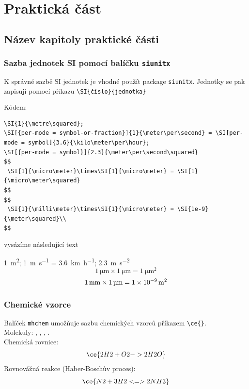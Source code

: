\documentclass[12pt]{report}
\begin{document}
\lipsum[6]

\part{Praktická část} %

\chapter{Název kapitoly praktické části}

\section{Sazba jednotek SI pomocí balíčku \texttt{siunitx}}

K správné sazbě SI jednotek je vhodné použít package \texttt{siunitx}.
Jednotky se pak zapisují pomocí příkazu \verb|\SI{číslo}{jednotka}|  

Kódem: 
{\footnotesize
\begin{verbatim}
\SI{1}{\metre\squared}; 
\SI[{per-mode = symbol-or-fraction}]{1}{\meter\per\second} = \SI[per-mode = symbol]{3.6}{\kilo\meter\per\hour};
\SI[{per-mode = symbol}]{2.3}{\meter\per\second\squared} 
$$
 \SI{1}{\micro\meter}\times\SI{1}{\micro\meter} = \SI{1}{\micro\meter\squared}
$$ 
$$
 \SI{1}{\milli\meter}\times\SI{1}{\micro\meter} = \SI{1e-9}{\meter\squared}\\
$$
\end{verbatim}}
vysázíme následující text

\SI{1}{\metre\squared}; 
  \SI[{per-mode = symbol-or-fraction}]{1}{\meter\per\second} = \SI[per-mode = symbol]{3.6}{\kilo\meter\per\hour};
  \SI[{per-mode = symbol}]{2.3}{\meter\per\second\squared} 
$$
   \SI{1}{\micro\meter}\times\SI{1}{\micro\meter} = \SI{1}{\micro\meter\squared}
$$ 
$$
   \SI{1}{\milli\meter}\times\SI{1}{\micro\meter} = \SI{1e-9}{\meter\squared}\\
$$

\section{Chemické vzorce}

Balíček \texttt{mhchem} umožňuje sazbu chemických vzorců příkazem \verb|\ce{}|.\\
Molekuly: , , , .\\
Chemická rovnice:
$$\ce{2H2 + O2 -> 2H2O}$$
Rovnovážná reakce (Haber-Boschův proces):
$$\ce{N2 + 3H2 <=> 2NH3}$$
\end{document}
